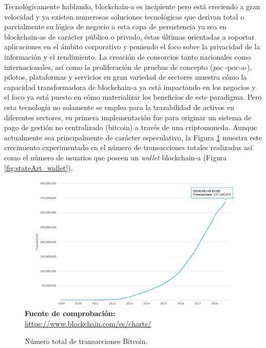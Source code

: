 \documentclass[12pt,a4paper, twoside]{report}
\begin{document}
	Tecnológicamente hablando, \gls{blockchain-a} es incipiente pero está creciendo a gran velocidad y ya existen numerosas soluciones tecnológicas que derivan total o parcialmente su lógica de negocio a esta capa de persistencia ya sea en \glspl{blockchain-a} de carácter público o privado, éstas últimas orientadas a soportar aplicaciones en el ámbito corporativo y poniendo el foco sobre la privacidad de la información y el rendimiento. La creación de consorcios tanto nacionales como internacionales, así como la proliferación de pruebas de concepto (\textit{\gls{poc}} -\gls{poc-a}-), pilotos, plataformas y servicios en gran variedad de sectores muestra cómo la capacidad transformadora de \gls{blockchain-a} ya está impactando en los negocios y el foco ya está puesto en cómo materializar los beneficios de este paradigma. Pero esta tecnología no solamente se emplea para la trazabilidad de activos en diferentes sectores, su primera implementación fue para originar un sistema de pago de gestión no centralizado (\gls{bitcoin}) a través de una criptomoneda. Aunque actualmente sea principalmente de carácter especulativo, la Figura \ref{fig:stateArt_transactions} muestra este crecimiento experimentado en el número de transacciones totales realizadas así como el número de usuarios que poseen un \textit{wallet}  \gls{blockchain-a} (Figura \ref{fig:stateArt_wallet}).

	\newpage
	
		\begin{figure}[!ht]   
			\caption{Número total de transacciones Bitcoin.} 
			\begin{center} 
				\includegraphics[width=16cm,height=6.5cm]{Images/stateArt/transactions} \\
				\label{fig:stateArt_transactions} 
				\textbf{Fuente de comprobación:} \url{https://www.blockchain.com/es/charts/}
			\end{center}  
		\end{figure}
	
\end{document}
